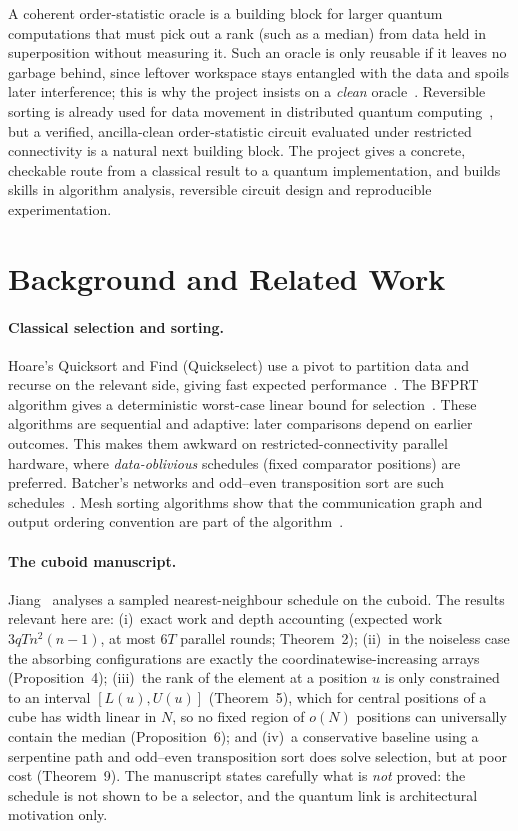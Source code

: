 \documentclass[11pt,a4paper]{article}
\begin{document}
A coherent order-statistic oracle is a building block for larger quantum computations that must pick out a rank (such as a median) from data held in superposition without measuring it. Such an oracle is only reusable if it leaves no garbage behind, since leftover workspace stays entangled with the data and spoils later interference; this is why the project insists on a \emph{clean} oracle~\cite{guide}. Reversible sorting is already used for data movement in distributed quantum computing~\cite{beals}, but a verified, ancilla-clean order-statistic circuit evaluated under restricted connectivity is a natural next building block. The project gives a concrete, checkable route from a classical result to a quantum implementation, and builds skills in algorithm analysis, reversible circuit design and reproducible experimentation.

\section{Background and Related Work}

\paragraph{Classical selection and sorting.}
Hoare's Quicksort and Find (Quickselect) use a pivot to partition data and recurse on the relevant side, giving fast expected performance~\cite{hoare62,hoare61}. The BFPRT algorithm gives a deterministic worst-case linear bound for selection~\cite{bfprt}. These algorithms are sequential and adaptive: later comparisons depend on earlier outcomes. This makes them awkward on restricted-connectivity parallel hardware, where \emph{data-oblivious} schedules (fixed comparator positions) are preferred. Batcher's networks and odd--even transposition sort are such schedules~\cite{batcher,knuth,habermann}. Mesh sorting algorithms show that the communication graph and output ordering convention are part of the algorithm~\cite{leighton}.

\paragraph{The cuboid manuscript.}
Jiang~\cite{jiang} analyses a sampled nearest-neighbour schedule on the cuboid. The results relevant here are: (i)~exact work and depth accounting (expected work $3qTn^2(n-1)$, at most $6T$ parallel rounds; Theorem~2); (ii)~in the noiseless case the absorbing configurations are exactly the coordinatewise-increasing arrays (Proposition~4); (iii)~the rank of the element at a position $u$ is only constrained to an interval $[L(u),U(u)]$ (Theorem~5), which for central positions of a cube has width linear in $N$, so no fixed region of $o(N)$ positions can universally contain the median (Proposition~6); and (iv)~a conservative baseline using a serpentine path and odd--even transposition sort does solve selection, but at poor cost (Theorem~9). The manuscript states carefully what is \emph{not} proved: the schedule is not shown to be a selector, and the quantum link is architectural motivation only.
\end{document}
